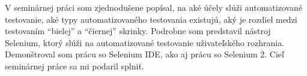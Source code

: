 V seminárnej práci som zjednodušene popísal, na aké účely slúži automatizované testovanie, aké typy automatizovaného testovania existujú, aký je rozdiel medzi testovaním ``bielej'' a ``čiernej'' skrinky. Podrobne som predstavil nástroj Selenium, ktorý slúži na automatizované testovanie uživateľského rozhrania. Demonštroval som prácu so Selenium IDE, ako aj prácu so Selenium 2.
Cieľ seminárnej práce sa mi podaril splniť. 